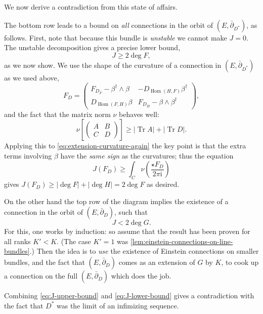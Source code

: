 \documentclass[12pt,letterpaper,reqno]{article}
\numberwithin{equation}{section}
\newcommand{\I}{{\mathrm i}}
\newcommand{\abs}[1]{\lvert#1\rvert}
\newcommand{\ti}[1]{\textit{#1}}
\DeclareMathOperator{\Tr}{Tr}
\DeclareMathOperator{\Hom}{Hom}
\newcommand{\fixme}[1]{{\color{orange}{[#1]}}}
\begin{document}
\begin{pf}
We now derive a contradiction from this state of affairs.

The bottom row leads to a bound on \ti{all}
connections in the orbit of $(E,\bar\partial_{D^*})$,
as follows.
First, note that because this bundle is \ti{unstable}
we cannot make $J= 0$. The unstable
decomposition gives a precise lower bound,
\begin{equation} \label{eq:J-lower-bound}
  J \ge 2 \deg F,
\end{equation}
as we now show.
We use the shape of the
curvature of a connection in $(E,\bar\partial_{D^*})$
as we used above,
\begin{equation} \label{eq:extension-curvature-again}
  F_D = \begin{pmatrix} F_{D_F} - \beta^\dagger \wedge \beta & - D_{\Hom(H,F)} \beta^\dagger \\ D_{\Hom(F,H)} \beta & F_{D_{H}} - \beta \wedge \beta^\dagger \end{pmatrix},
\end{equation}
and the fact that the matrix norm $\nu$ behaves well:
\begin{equation}
  \nu\left[\begin{pmatrix} A & B \\ C & D \end{pmatrix} \right] \ge \abs{\Tr A} + \abs{\Tr D}.
\end{equation}
Applying this to \eqref{eq:extension-curvature-again} the key point
is that the extra terms involving $\beta$ have the \ti{same sign}
as the curvatures; thus the equation
\begin{equation}
  J(F_D) \ge \int_C \nu\left(\frac{\star F_D}{2 \pi \I}\right)
\end{equation}
gives $J(F_D) \ge \abs{\deg F}+\abs{\deg H} = 2 \deg F$
as desired.

On the other hand the top row of the diagram implies the existence
of a connection in the orbit of $(E,\bar\partial_D)$,
such that
\begin{equation} \label{eq:J-upper-bound}
  J < 2 \deg G.
\end{equation}
For this, one works by induction: so assume that the
result has been proven for all ranks $K'<K$.
(The case $K'=1$ was \autoref{lem:einstein-connections-on-line-bundles}.)
Then the idea is to \ti{use} the existence of Einstein connections on
smaller bundles, and the fact that $(E,\bar\partial_D)$
comes as an extension of $G$ by $K$,
to cook up a connection on the full $(E,\bar\partial_D)$
which does the job. \fixme{...}

Combining \eqref{eq:J-upper-bound} and \eqref{eq:J-lower-bound}
gives a contradiction with the fact
that $D^*$ was the limit of an infimizing sequence.

\end{pf}
\end{document}

